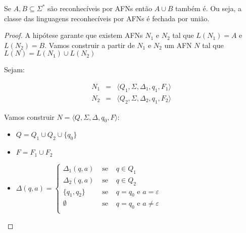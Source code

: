 \begin{lemma}
  Se $A, B \subseteq \Sigma^*$ são reconhecíveis por AFNs então $A \cup B$ também é.
  Ou seja, a classe das linguagens reconhecíveis por AFNs é fechada por união.
\end{lemma}
\begin{proof}
  A hipótese garante que existem AFNs $N_1$ e $N_2$ tal que $L(N_1) = A$ e $L(N_2) = B$.
  Vamos construir a partir de $N_1$ e $N_2$ um AFN $N$ tal que $L(N) = L(N_1) \cup L(N_2)$

  Sejam:

  \begin{eqnarray*}
    N_1 & = & \langle Q_1, \Sigma, \Delta_1, q_1, F_1 \rangle\\
    N_2 & = & \langle Q_2, \Sigma, \Delta_2, q_1, F_2 \rangle
  \end{eqnarray*}

  Vamos construir $N = \langle Q, \Sigma, \Delta, q_0, F \rangle$:

  \begin{itemize}
  \item[] $Q = Q_1 \cup Q_2 \cup \{q_0\}$
  \item[] $F = F_1 \cup F_2$
  \item[] $\Delta(q,a) = \left\{
    \begin{array}{ccc}
      \Delta_1(q, a) & \textrm{ se } & q \in Q_1\\
      \Delta_2(q, a) & \textrm{ se } & q \in Q_2\\
      \{q_1, q_2\}   & \textrm{ se } & q = q_0 \textrm{ e } a = \varepsilon \\
      \emptyset     & \textrm{ se }  & q = q_0 \textrm{ e } a \neq \varepsilon \\
    \end{array}\right.$
  \end{itemize}


\end{proof}
